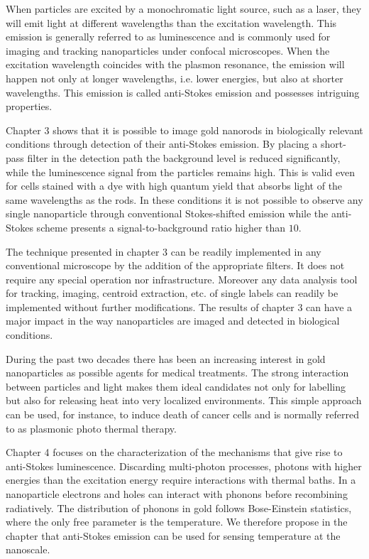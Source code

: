 When particles are excited by a monochromatic light source, such as a laser,
they will emit light at different wavelengths than the excitation wavelength.
This emission is generally referred to as luminescence and is commonly used for
imaging and tracking nanoparticles under confocal microscopes. When the
excitation wavelength coincides with the plasmon resonance, the emission will
happen not only at longer wavelengths, i.e. lower energies, but also at shorter
wavelengths. This emission is called anti-Stokes emission and possesses
intriguing properties.

Chapter 3 shows that it is possible to image gold nanorods in biologically
relevant conditions through detection of their anti-Stokes emission. By placing
a short-pass filter in the detection path the background level is reduced
significantly, while the luminescence signal from the particles remains high.
This is valid even for cells stained with a dye with high quantum yield
that absorbs light of the same wavelengths as the rods. In these conditions it
is not possible to observe any single nanoparticle through conventional
Stokes-shifted emission while the anti-Stokes scheme presents a
signal-to-background ratio higher than $10$.

The technique presented in chapter 3 can be readily implemented in any
conventional microscope by the addition of the appropriate filters. It does not
require any special operation nor infrastructure. Moreover any data analysis
tool for tracking, imaging, centroid extraction, etc. of single labels can
readily be implemented without further modifications. The results of chapter 3
can have a major impact in the way nanoparticles are imaged and detected in
biological conditions.

During the past two decades there has been an increasing interest in gold
nanoparticles as possible agents for medical treatments. The strong interaction
between particles and light makes them ideal candidates not only for labelling
but also for releasing heat into very localized environments. This simple
approach can be used, for instance, to induce death of cancer cells and is
normally referred to as plasmonic photo thermal therapy.

Chapter 4 focuses on the characterization of the mechanisms that give rise to
anti-Stokes luminescence. Discarding multi-photon processes, photons with higher
energies than the excitation energy require interactions with thermal baths. In
a nanoparticle electrons and holes can interact with phonons before recombining
radiatively. The distribution of phonons in gold follows Bose-Einstein
statistics, where the only free parameter is the temperature. We
therefore propose in the chapter that anti-Stokes emission can be used for
sensing temperature at the nanoscale.

